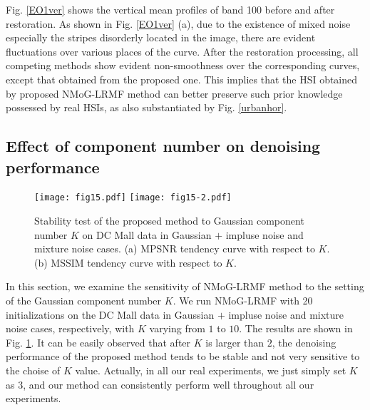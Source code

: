 \documentclass[journal]{IEEEtran}
\begin{document}
Fig. \ref{EO1ver} shows the vertical mean profiles of band 100 before and after restoration. As shown in Fig. \ref{EO1ver} (a), due to the existence of mixed noise especially the stripes disorderly located in the image, there are evident fluctuations over various places of the curve. After the restoration processing, all competing methods show evident non-smoothness over the corresponding curves, except that obtained from the proposed one. This implies that the HSI obtained by proposed NMoG-LRMF method can better preserve such prior knowledge possessed by real HSIs, as also substantiated by Fig. \ref{urbanhor}.

\subsection{Effect of component number on denoising performance}
		\begin{figure}
			\centering
			\texttt{[image: fig15.pdf]}
\texttt{[image: fig15-2.pdf]}
			\caption{Stability test of the proposed method to Gaussian component number $K$ on DC Mall data in Gaussian $ + $ impluse noise and mixture noise cases. (a) MPSNR tendency curve with respect to $K$.  (b) MSSIM tendency curve with respect to $K$.}	 \label{impluse} 
		\end{figure}
		
In this section, we examine the sensitivity of NMoG-LRMF method to the setting of the Gaussian component number $ K $. We run NMoG-LRMF with 20 initializations on the DC Mall data in Gaussian $ + $ impluse noise and  mixture noise cases, respectively, with $K$ varying from $1$ to $10$. The results are shown in Fig. \ref{impluse}. It can be easily observed that after $K$ is larger than $2$, the denoising performance of the proposed method tends to be stable and not very sensitive to the choise of $K$ value. Actually, in all our real experiments, we just simply set $K$ as $3$, and our method can consistently perform well throughout all our experiments.
				
\end{document}
